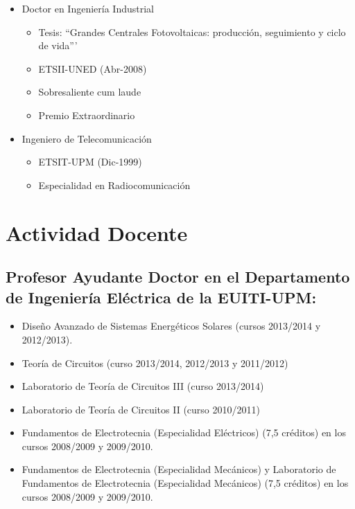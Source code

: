 \documentclass[article, a4paper]{memoir}
\begin{document}
\begin{itemize}
\item Doctor en Ingeniería Industrial
\begin{itemize}
\item Tesis: ``Grandes Centrales Fotovoltaicas: producción,
seguimiento y ciclo de vida'''
\item ETSII-UNED (Abr-2008)
\item Sobresaliente cum laude
\item Premio Extraordinario
\end{itemize}

\item Ingeniero de Telecomunicación
\begin{itemize}
\item ETSIT-UPM (Dic-1999)
\item Especialidad en Radiocomunicación
\end{itemize}
\end{itemize}


\section{Actividad Docente}
\label{sec-3}

\subsection{Profesor Ayudante Doctor en el Departamento de Ingeniería Eléctrica de la EUITI-UPM:}
\label{sec-3-1}

\begin{itemize}
\item Diseño Avanzado de Sistemas Energéticos Solares (cursos 2013/2014 y 2012/2013).

\item Teoría de Circuitos (curso 2013/2014, 2012/2013 y 2011/2012)

\item Laboratorio de Teoría de Circuitos III (curso 2013/2014)

\item Laboratorio de Teoría de Circuitos II (curso 2010/2011)

\item Fundamentos de Electrotecnia (Especialidad Eléctricos) (7,5
créditos) en los cursos 2008/2009 y 2009/2010.

\item Fundamentos de Electrotecnia (Especialidad Mecánicos) y Laboratorio
de Fundamentos de Electrotecnia (Especialidad Mecánicos) (7,5
créditos) en los cursos 2008/2009 y 2009/2010.
\end{itemize}
\end{document}

